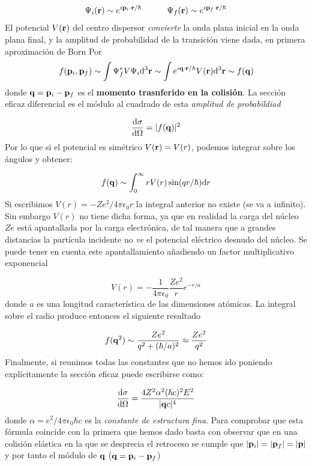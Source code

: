 \begin{equation}
	\Psi_i (\mathbf{r}) \sim e^{i \mathbf{p}_i \cdot \mathbf{r} / \hbar} \quad \quad \quad \Psi_f (\mathbf{r}) \sim e^{i \mathbf{p}_f \cdot \mathbf{r} / \hbar}
\end{equation}
El potencial $V(\mathbf{r})$ del centro dispersor \textit{convierte} la onda plana inicial en la onda plana final, y la amplitud de probabilidad de la transición viene dada, en primera aproximación de Born Por
\begin{equation}
	f(\mathbf{p}_i,\mathbf{p}_f) \sim \int \Psi_f^* V \Psi_i \mathrm{d}^3 \mathbf{r} \sim \int e^{i \mathbf{q} \cdot \mathbf{r} / \hbar} V(\mathbf{r}) \mathrm{d}^3 \mathbf{r} \sim f(\mathbf{q})
\end{equation}
donde $\mathbf{q}=\mathbf{p}_i - \mathbf{p}_f$ es el \textbf{momento trasnferido en la colisión}. La sección eficaz diferencial es el módulo al cuadrado de esta \textit{amplitud de probabildiad}

\begin{equation}
	\frac{\mathrm{d} \sigma}{\mathrm{d} \Omega} = | f(\mathbf{q}) |^2
\end{equation}
Por lo que si el potencial es simétrico $V(\mathbf{r})=V(r)$, podemos integrar sobre los ángulos y obtener:

\begin{equation}
	f(\mathbf{q}) \sim \int_0^\infty r V(r) \sin (qr/\hbar) \mathrm{d} r
\end{equation}
Si escribimos $V(r)=-Ze^2/4\pi \epsilon_0 r$ la integral anterior no existe (se va a infinito). Sin embargo $V(r)$ no tiene dicha forma, ya que en realidad la carga del núcleo $Ze$ está apantallada por la carga electrónica, de tal manera que a grandes distancias la partícula incidente no \textit{ve} el potencial eléctrico desnudo del núcleo. Se puede tener en cuenta este apantallamiento añadiendo un factor multiplicativo exponencial

\begin{equation}
    V(r) =  - \frac{1}{4 \pi \epsilon_0} \frac{Ze^2}{r} e^{-r/a}
\end{equation}
donde $a$ es una longitud característica de las dimensiones atómicas. La integral sobre el radio produce entonces el siguiente resultado

\begin{equation}
    f(\mathbf{q}^2) \sim \frac{Ze^2}{q^2+(\hbar/a)^2} \approx \frac{Ze^2}{q^2}
\end{equation}
Finalmente, si reunimos todas las constantes que no hemos ido poniendo explícitamente la sección eficaz puede escribirse como:

\begin{eqnarray}
	\frac{\mathrm{d} \sigma}{\mathrm{d} \Omega} = \frac{4Z^2\alpha^2 (\hbar c)^2 E^2 }{|\mathbf{q} c|^4}
\end{eqnarray}
donde $\alpha = e^2 / 4 \pi \epsilon_0 \hbar c$ es la \textit{constante de estructura fina}. Para comprobar que esta fórmula coincide con la primera que hemos dado basta con observar que en una colisión elástica en la que se desprecia el retroceso se cumple que $|\mathbf{p}_i|=|\mathbf{p}_f|=|\mathbf{p}|$ y por tanto el módulo de $\mathbf{q}$ ($\mathbf{q}=\mathbf{p}_i-\mathbf{p}_f$)

